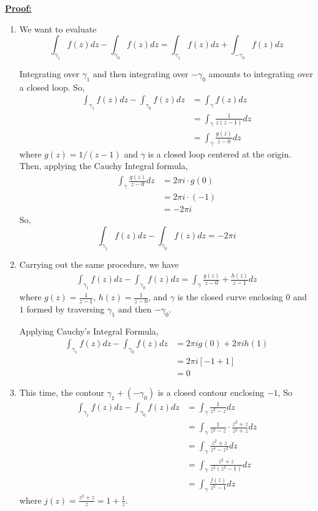 \documentclass{article}
\begin{document}
\vskip 0.5cm
\underline{\textbf{Proof:}}

\begin{enumerate}[label=(\alph*)]
  \item We want to evaluate 
  \[  \int_{{\gamma_1}} f(z) dz - \int_{{\gamma_0}} f(z) dz = \int_{{\gamma_1}} f(z) dz + \int_{{-\gamma_0}} f(z) dz  \]
  
  Integrating over $\gamma_1$ and then integrating over $-\gamma_0$ amounts to integrating over a closed loop. So, 
  \begin{align*}
    \int_{{\gamma_1}} f(z) dz - \int_{{\gamma_0}} f(z) dz &= \int_{\gamma} f(z) dz \\
    &= \int_{\gamma} \frac{1}{z(z-1)} dz \\
    &= \int_{\gamma} \frac{g(z)}{z - 0} dz
  \end{align*}
  where $g(z) = 1/(z-1)$ and $\gamma$ is a closed loop centered at the origin. Then, applying the Cauchy Integral formula, 
  \begin{align*}
    \int_{\gamma} \frac{g(z)}{z - 0} dz &= 2\pi i \cdot g(0) \\
    &= 2\pi i \cdot (-1) \\
    &= -2\pi i
  \end{align*}
  So, 
  \[ \boxed{ \int_{{\gamma_1}} f(z) dz - \int_{{\gamma_0}} f(z) dz = -2\pi i  } \]

  \vskip 0.5cm
  \item Carrying out the same procedure, we have 
  \begin{align*}
    \int_{{\gamma_1}} f(z) dz - \int_{{\gamma_0}} f(z) dz = \int_{\gamma} \frac{g(z)}{z-0} + \frac{h(z)}{z-1} dz 
  \end{align*}
  where $g(z) = \frac{1}{z-1}$, $h(z) = \frac{1}{z-0}$, and $\gamma$ is the closed curve enclosing $0$ and $1$ formed by traversing $\gamma_1$ and then $-\gamma_0$.
  
  \vskip 0.25cm
  Applying Cauchy's Integral Formula, 
  \begin{align*}
    \int_{{\gamma_1}} f(z) dz - \int_{{\gamma_0}} f(z) dz &= 2\pi i g(0) + 2\pi i h(1) \\
    &= 2\pi i \left[ -1 + 1 \right] \\
    &= 0
  \end{align*}

  \vskip 0.5cm
  \item This time, the contour $\gamma_1 + \left( - \gamma_0\right)$ is a closed contour enclosing $-1$, So
  \begin{align*}
    \int_{{\gamma_1}} f(z) dz - \int_{{\gamma_0}} f(z) dz &= \int_{\gamma} \frac{1}{z^2 - z} dz \\
    &= \int_{\gamma} \frac{1}{z^2 - z} \cdot \frac{z^2 + z}{z^2 + z} dz \\
    &= \int_{\gamma} \frac{z^2 + z}{z^4 - z^2} dz \\
    &= \int_{\gamma} \frac{z^2 + z}{z^2 \left(z^2 - 1\right)} dz \\
    &= \int_{\gamma} \frac{j(z)}{z^2 - 1} dz
  \end{align*}
  where $j(z) = \frac{z^2 + z}{z} = 1 + \frac{1}{z}$.


\end{enumerate}
\end{document}
